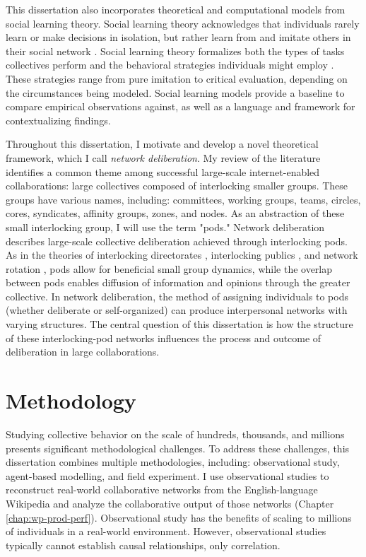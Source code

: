 This dissertation also incorporates theoretical and computational models from
social learning theory.
Social learning theory acknowledges that individuals rarely
learn or make decisions in isolation, but rather learn from and imitate others
in their social network
\cite{golub_naive_2010}.
Social learning theory
formalizes both the types of tasks collectives perform
\cite{hong_interpreted_2009}
and the behavioral strategies individuals might employ
\cite{lazer_network_2007, barkoczi_social_2016}.
These strategies range from pure imitation to critical evaluation,
depending on the circumstances being modeled.
Social learning models provide a baseline to compare empirical observations
against,
as well as a language and framework for contextualizing findings.

Throughout this dissertation,
I motivate and develop a novel theoretical framework,
which I call {\em network deliberation}.
My review of the literature identifies a common theme
among successful large-scale internet-enabled collaborations:
large collectives composed of interlocking smaller groups.
These groups have various names, including:
committees, working groups, teams, circles, cores, syndicates,
affinity groups, zones, and nodes.
As an abstraction of these small interlocking group, I will use the term "pods."
Network deliberation describes large-scale collective deliberation achieved
through interlocking pods.
As in the theories of interlocking directorates \cite{levine_study_1979},
interlocking publics \cite{habermas_structural_1991},
and network rotation \cite{salehi_hive_2018},
pods allow for beneficial small group dynamics,
while the overlap between pods enables diffusion of information and opinions
through the greater collective.
In network deliberation, the method of assigning individuals to pods
(whether deliberate or self-organized) can produce interpersonal networks with
varying structures.
The central question of this dissertation is how the structure of these
interlocking-pod networks influences the process and outcome of deliberation
in large collaborations.

\section{Methodology}

Studying collective behavior on the scale of hundreds, thousands, and millions
presents significant methodological challenges.
To address these challenges, this dissertation combines multiple methodologies,
including: observational study, agent-based modelling, and field experiment.
I use observational studies to reconstruct real-world collaborative networks
from the English-language Wikipedia and analyze the collaborative output of
those networks (Chapter \ref{chap:wp-prod-perf}).
Observational study has the benefits of scaling to millions of individuals
in a real-world environment.
However, observational studies typically cannot establish causal relationships,
only correlation.

